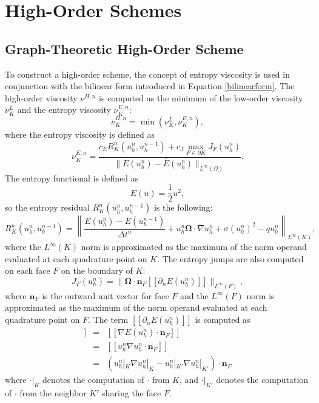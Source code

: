\section{High-Order Schemes}
\subsection{Graph-Theoretic High-Order Scheme}\label{gthighorder}
To construct a high-order scheme, the concept of entropy viscosity is used in
conjunction with the bilinear form introduced in Equation \eqref{bilinearform}.
The high-order viscosity $\nu^{H,n}$ is computed as the minimum of the low-order
viscosity $\nu^{L}_K$ and the entropy viscosity $\nu^{E,n}_K$:
\begin{equation}
   \nu^{H,n}_K = \min(\nu^{L}_K,\nu^{E,n}_K),
\end{equation}
where the entropy viscosity is defined as
\begin{equation}
   \nu^{E,n}_K = \frac{c_E R_K^n(u_h^n,u_h^{n-1})
      + c_J\max\limits_{F\in\partial K}J_F(u_h^n)}
      {\|E(u_h^n)-\bar{E}(u_h^n)\|_{L^\infty(\Omega)}}.
\end{equation}
The entropy functional is defined as
\begin{equation}
   E(u) = \frac{1}{2}u^2,
\end{equation}
so the entropy residual $R_K^n(u_h^n,u_h^{n-1})$ is the following:
\begin{equation}
    R_K^n(u_h^n,u_h^{n-1}) = \left\|\frac{E(u_h^n)-E(u_h^{n-1})}{\Delta t^n}
      + u_h^n\mathbf{\Omega}\cdot\nabla u_h^n
      + \sigma (u_h^n)^2
      - q u_h^n\right\|_{L^\infty(K)},
\end{equation}
where the $L^\infty(K)$ norm is approximated as the maximum of the norm operand evaluated
at each quadrature point on $K$.
The entropy jumps are also computed on each face $F$ on the boundary of $K$:
\begin{equation}
   J_F(u_h^n) = \|\mathbf{\Omega}\cdot
      \mathbf{n}_F[\![\partial_n E(u_h^n)]\!]\|_{L^\infty(F)},
\end{equation}
where $\mathbf{n}_F$ is the outward unit vector for face $F$ and
the $L^\infty(F)$ norm is approximated as the maximum of the norm operand evaluated
at each quadrature point on $F$. The term $[\![\partial_n E(u_h^n)]\!]$ is computed as
\begin{eqnarray}
   [\![\partial_n E(u_h^n)]\!] & = & [\![\nabla E(u_h^n)\cdot\mathbf{n}_F]\!]\\
                        & = & [\![u_h^n\nabla u_h^n\cdot\mathbf{n}_F]\!]\\
                        & = & (u_h^n|_K\nabla u_h^n|_K - u_h^n|_{K'}
                           \nabla u_h^n|_{K'})\cdot\mathbf{n}_F
\end{eqnarray}
where $\cdot|_K$ denotes the computation of $\cdot$ from $K$, and $\cdot|_{K'}$
denotes the computation of $\cdot$ from the neighbor $K'$ sharing the face $F$.


